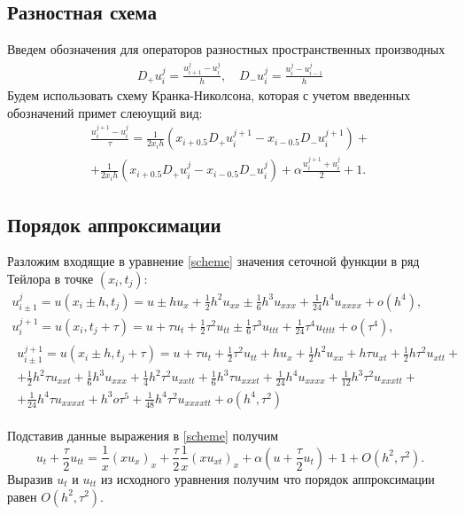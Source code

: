 \documentclass[a4paper,12pt]{article}
\begin{document}
\subsection*{Разностная схема}
Введем обозначения для операторов разностных пространственных производных
\begin{gather*}
  D_{+}u_{i}^{j}=\frac{u_{i+1}^{j}-u_{i}^{j}}{h}, \quad D_{-}u_{i}^{j}=\frac{u_{i}^{j}-u_{i-1}^{j}}{h}
\end{gather*}
Будем использовать схему Кранка-Николсона, которая с учетом введенных обозначений примет слеюущий вид:
\begin{multline}\label{scheme}
  \frac{u_{i}^{j+1}-u_{i}^{j}}{\tau}=\frac{1}{2 x_{i} h }\left(x_{i+0.5}D_{+}u_{i}^{j+1}-x_{i-0.5}D_{-}u_{i}^{j+1}\right)+\\
  +\frac{1}{2 x_{i} h }\left(x_{i+0.5}D_{+}u_{i}^{j}-x_{i-0.5}D_{-}u_{i}^{j}\right)+\alpha\frac{u_{i}^{j+1}+u_{i}^{j}}{2}+1.
\end{multline}

\subsection*{Порядок аппроксимации}

Разложим входящие в уравнение \cref{scheme} значения сеточной функции в ряд Тейлора в точке \((x_i, t_j)\):
\begin{gather*}
  u_{i\pm1}^{j}=u(x_{i}\pm h, t_{j})=u \pm h u_x +\frac{1}{2} h^2 u_{xx} \pm \frac{1}{6} h^3 u_{xxx} + \frac{1}{24} h^4 u_{xxxx} + o(h^{4}),\\
  u_{i}^{j+1}=u(x_{i}, t_{j}+\tau)=u + \tau u_t +\frac{1}{2} \tau^2 u_{tt} \pm \frac{1}{6} \tau^3 u_{ttt} + \frac{1}{24} \tau^4 u_{tttt} + o(\tau^{4}),\\
  \begin{split}
    u_{i\pm1}^{j+1}=u(x_{i}\pm h,t_{j}+\tau)=u+\tau  u_t+\frac{1}{2} \tau ^2 u_{tt}+h u_x+\frac{1}{2} h^2 u_{xx}+h \tau  u_{xt}+\frac{1}{2} h \tau ^2 u_{xtt}+\\
    +\frac{1}{2} h^2 \tau  u_{xxt}+\frac{1}{6} h^3 u_{xxx}+\frac{1}{4} h^2 \tau ^2 u_{xxtt}+\frac{1}{6} h^3 \tau  u_{xxxt}+\frac{1}{24} h^4 u_{xxxx}+\frac{1}{12} h^3 \tau ^2 u_{xxxtt}+\\
    +\frac{1}{24} h^4 \tau  u_{xxxxt}+h^3 o \tau ^5+\frac{1}{48} h^4 \tau ^2 u_{xxxxtt}+o(h^4, \tau^2)
  \end{split}
\end{gather*}

Подставив данные выражения в \cref{scheme} получим
\begin{equation*}
  u_{t}+\frac{\tau}{2} u_{tt} = \frac{1}{x}\left(x u_{x}\right)_{x} + \frac{\tau}{2} \frac{1}{x}\left(x u_{xt}\right)_{x} + \alpha \left(u + \frac{\tau}{2} u_{t}\right) + 1 + O(h^2, \tau^2).
\end{equation*}
Выразив \(u_{t}\) и \(u_{tt}\) из исходного уравнения получим что порядок аппроксимации равен \(O(h^2, \tau^2)\).
\end{document}
